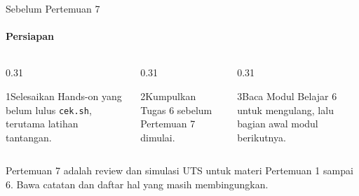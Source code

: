 \documentclass[t]{beamer}
\begin{document}
\begin{frame}{Sebelum Pertemuan 7}
\framesubtitle{Persiapan}
\begin{columns}[T]
\begin{column}{0.31\textwidth}
\begin{Langkah}{1}{Selesaikan}
Hands-on yang belum lulus \texttt{cek.sh}, terutama latihan tantangan.
\end{Langkah}
\end{column}
\begin{column}{0.31\textwidth}
\begin{Langkah}{2}{Kumpulkan}
Tugas 6 sebelum Pertemuan 7 dimulai.
\end{Langkah}
\end{column}
\begin{column}{0.31\textwidth}
\begin{Langkah}{3}{Baca}
Modul Belajar 6 untuk mengulang, lalu bagian awal modul berikutnya.
\end{Langkah}
\end{column}
\end{columns}
\vspace{10pt}
Pertemuan 7 adalah review dan simulasi UTS untuk materi Pertemuan 1 sampai 6. Bawa catatan dan daftar hal yang masih membingungkan.
\end{frame}

\end{document}
